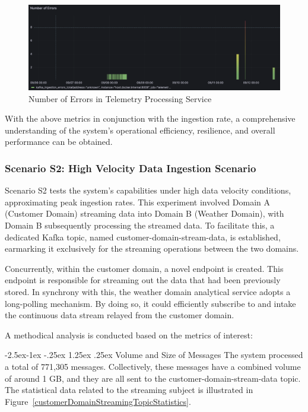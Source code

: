 \documentclass[preprint,12pt]{elsarticle}
\makeatletter
\renewcommand\paragraph{\@startsection{paragraph}{4}{\z@}%
            {-2.5ex\@plus -1ex \@minus -.25ex}%
            {1.25ex \@plus .25ex}%
            {\normalfont\normalsize\itshape}}
\makeatother
\begin{document}
\begin{figure}

  \centering

  \includegraphics[width=\columnwidth]{images/number-of-errors-in-telemetry-processing-service.png}

  \caption{Number of Errors in Telemetry Processing Service}

  \label{numberOfErrorsInTelemetryProcessingService}

\end{figure}

With the above metrics in conjunction with the ingestion rate, a comprehensive understanding of the system's operational efficiency, resilience, and overall performance can be obtained.

\subsubsection{Scenario S2: High Velocity Data Ingestion Scenario}

Scenario S2 tests the system's capabilities under high data velocity conditions, approximating peak ingestion rates. This experiment involved Domain A (Customer Domain) streaming data into Domain B (Weather Domain), with Domain B subsequently processing the streamed data. To facilitate this, a dedicated Kafka topic, named customer-domain-stream-data, is established, earmarking it exclusively for the streaming operations between the two domains. 

Concurrently, within the customer domain, a novel endpoint is created. This endpoint is responsible for streaming out the data that had been previously stored. In synchrony with this, the weather domain analytical service adopts a long-polling mechanism. By doing so, it could efficiently subscribe to and intake the continuous data stream relayed from the customer domain.

A methodical analysis is conducted based on the metrics of interest:

\paragraph{Volume and Size of Messages} The system processed a total of 771,305 messages. Collectively, these messages have a combined volume of around 1 GB, and they are all sent to the customer-domain-stream-data topic. The statistical data related to the streaming subject is illustrated in Figure~\ref{customerDomainStreamingTopicStatistics}.
\end{document}
